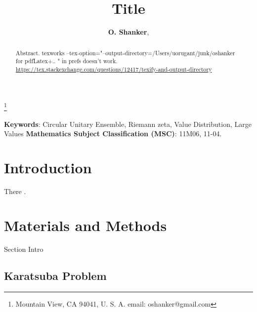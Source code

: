 \documentclass[twoside]{article}
\begin{document}


\newtheorem{theorem}{Theorem}[section]
\newtheorem{lemma}[theorem]{Lemma}

\theoremstyle{definition}
\newtheorem{definition}[theorem]{Definition}
\newtheorem{example}[theorem]{Example}
\newtheorem{xca}[theorem]{Exercise}

\theoremstyle{remark}
\newtheorem{remark}[theorem]{Remark}



\date{}
\lhead[]{}
\rhead[]{}

\title{\bf{Title}}

\maketitle


\author{{\textbf{O. Shanker}},}
\thanks{ Mountain View, CA 94041, U. S. A. email: oshanker@gmail.com}

\thispagestyle{fancy}

\begin{abstract}
Abstract. 
texworks
--tex-option="--output-directory=/Users/uorugant/junk/oshanker for pdfLatex+.. "  in prefs
doesn't work.
\url{https://tex.stackexchange.com/questions/12417/texify-and-output-directory}

\end{abstract}
{\textbf {Keywords}:} Circular Unitary Ensemble, Riemann zeta, Value Distribution,  Large Values 
{\textbf {Mathematics Subject Classification (MSC)}:} 11M06, 11-04.


\symbolfootnote[0]{*}


\section{Introduction}

 There .


\section{\label{sec2}Materials and Methods}
Section Intro

\subsection{\label{seckaratsuba}Karatsuba Problem}
\end{document}

